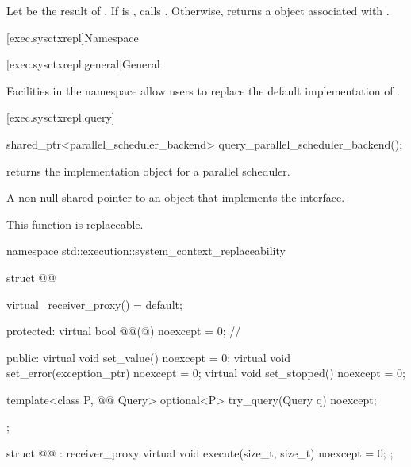 \begin{itemdescr}
\pnum
\effects
Let  be the result of .
If  is ,
calls .
Otherwise, returns a  object
associated with .
\end{itemdescr}

[exec.sysctxrepl]{Namespace }

[exec.sysctxrepl.general]{General}

\pnum
Facilities in the  namespace
allow users to replace the default implementation of .

[exec.sysctxrepl.query]{}
%
\begin{itemdecl}
shared_ptr<parallel_scheduler_backend> query_parallel_scheduler_backend();
\end{itemdecl}

\begin{itemdescr}
\pnum
{} returns
the implementation object for a parallel scheduler.

\pnum
\returns
A non-null shared pointer to an object
that implements the  interface.

\pnum
\remarks
This function is replaceable.
\end{itemdescr}

\begin{codeblock}
namespace std::execution::system_context_replaceability {
  struct @@ {
    virtual ~receiver_proxy() = default;

  protected:
    virtual bool @@(@\unspecnc@) noexcept = 0;   // \expos

  public:
    virtual void set_value() noexcept = 0;
    virtual void set_error(exception_ptr) noexcept = 0;
    virtual void set_stopped() noexcept = 0;

    template<class P, @@ Query>
      optional<P> try_query(Query q) noexcept;
  };

  struct @@ : receiver_proxy {
    virtual void execute(size_t, size_t) noexcept = 0;
  };
}
\end{codeblock}

